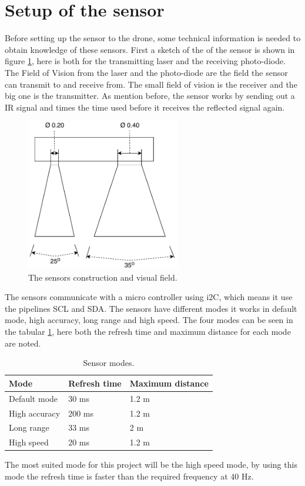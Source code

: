 \section{Setup of the sensor}\label{setup_sensor}
Before setting up the sensor to the drone, some technical information is needed to obtain knowledge of these sensors.
First a sketch of the of the sensor is shown in figure \ref{fig:sensor_geometric}, here is both for the transmitting laser and the receiving photo-diode. The Field of Vision from the laser and the photo-diode are the field the sensor can transmit to and receive from. The small field of vision is the receiver and the big one is the transmitter. 
As mention before, the sensor works by sending out a IR signal and times the time used before it receives the reflected signal again.
\begin{figure}[H]
    \centering
    \includegraphics[width=0.6\textwidth]{figures/ch_design/Sensor.pdf}
    \caption{The sensors construction and visual field.}
    \label{fig:sensor_geometric}
\end{figure}
The sensors communicate with a micro controller using i2C, which means it use the pipelines SCL and SDA. The sensors have different modes it works in default mode, high accuracy, long range and high speed. The four modes can be seen in the tabular \ref{tab:sensor_mode}, here both the refresh time and maximum distance for each mode are noted. 
\begin{table}[H]
\caption{Sensor modes.}\label{tab:sensor_mode}
\centering
\begin{tabular}{|l|l|l|}
\hline
\textbf{Mode}          & \textbf{Refresh time} & \textbf{Maximum distance} \\ \hline
Default mode  & 30 ms        & 1.2 m            \\ \hline
High accuracy & 200 ms       & 1.2 m            \\ \hline
Long range    & 33 ms        & 2 m              \\ \hline
High speed    & 20 ms        & 1.2 m            \\ \hline
\end{tabular}
\end{table}
The most suited mode for this project will be the high speed mode, by using this mode the refresh time is faster than the required frequency at 40 Hz.  

